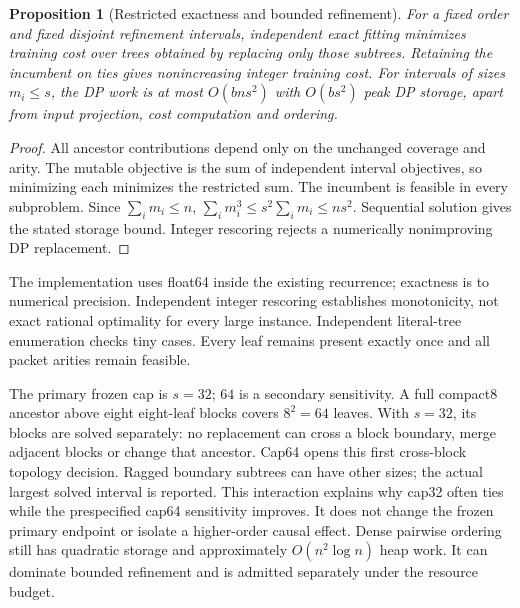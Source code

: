 \documentclass[10pt,journal,compsoc]{IEEEtran}
\newtheorem{proposition}[theorem]{Proposition}
\theoremstyle{definition}\newtheorem{definition}[theorem]{Definition}
\begin{document}
\begin{proposition}[Restricted exactness and bounded refinement]\label{prop:jrefine}
For a fixed order and fixed disjoint refinement intervals, independent exact
fitting minimizes training cost over trees obtained by replacing only those
subtrees. Retaining the incumbent on ties gives nonincreasing integer
training cost. For intervals of sizes $m_i\le s$, the DP work is at most
$O(bns^2)$ with $O(bs^2)$ peak DP storage, apart from input projection,
cost computation and ordering.
\end{proposition}
\begin{proof}
All ancestor contributions depend only on the unchanged coverage and arity.
The mutable objective is the sum of independent interval objectives, so
minimizing each minimizes the restricted sum. The incumbent is feasible in
every subproblem. Since $\sum_im_i\le n$,
$\sum_im_i^3\le s^2\sum_im_i\le ns^2$. Sequential solution gives the stated
storage bound. Integer rescoring rejects a numerically nonimproving DP
replacement.
\end{proof}

The implementation uses float64 inside the existing recurrence; exactness
is to numerical precision. Independent integer rescoring establishes
monotonicity, not exact rational optimality for every large instance.
Independent literal-tree enumeration checks tiny cases. Every leaf remains
present exactly once and all packet arities remain feasible.

The primary frozen cap is $s=32$; $64$ is a secondary sensitivity.
A full compact8 ancestor above eight eight-leaf blocks covers $8^2=64$
leaves. With $s=32$, its blocks are solved separately: no replacement can
cross a block boundary, merge adjacent blocks or change that ancestor.
Cap64 opens this first cross-block topology decision. Ragged boundary
subtrees can have other sizes; the actual largest solved interval is reported.
This interaction explains why cap32 often ties while the prespecified cap64
sensitivity improves. It does not change the frozen primary endpoint or
isolate a higher-order causal effect.
Dense pairwise ordering still has quadratic storage and approximately
$O(n^2\log n)$ heap work. It can dominate bounded refinement and is admitted
separately under the resource budget.
\end{document}
